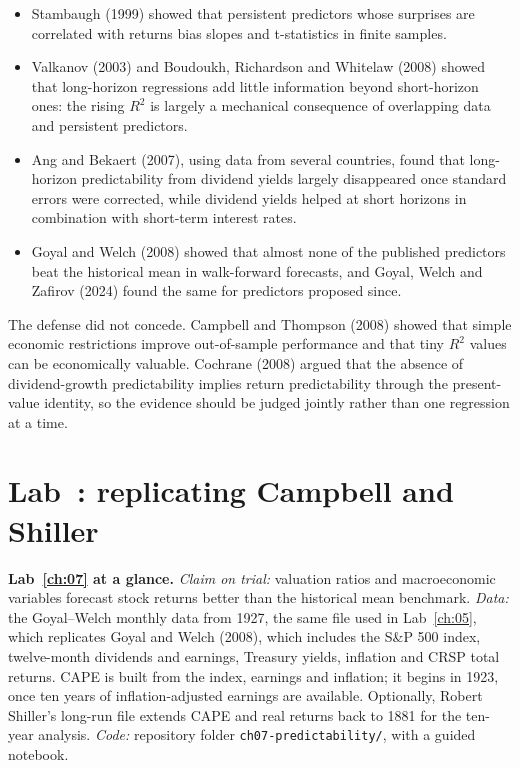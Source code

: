 \begin{itemize}
  \item Stambaugh (1999) showed that persistent predictors whose surprises are correlated with returns bias slopes and t-statistics in finite samples.
  \item Valkanov (2003) and Boudoukh, Richardson and Whitelaw (2008) showed that long-horizon regressions add little information beyond short-horizon ones: the rising $R^2$ is largely a mechanical consequence of overlapping data and persistent predictors.
  \item Ang and Bekaert (2007), using data from several countries, found that long-horizon predictability from dividend yields largely disappeared once standard errors were corrected, while dividend yields helped at short horizons in combination with short-term interest rates.
  \item Goyal and Welch (2008) showed that almost none of the published predictors beat the historical mean in walk-forward forecasts, and Goyal, Welch and Zafirov (2024) found the same for predictors proposed since.
\end{itemize}

The defense did not concede. Campbell and Thompson (2008) showed that simple economic restrictions improve out-of-sample performance and that tiny $R^2$ values can be economically valuable. Cochrane (2008) argued that the absence of dividend-growth predictability implies return predictability through the present-value identity, so the evidence should be judged jointly rather than one regression at a time.

\section{Lab~\thechapter: replicating Campbell and Shiller}
\label{sec:07-lab}

\begin{callout}
\textbf{Lab~\ref{ch:07} at a glance.} \emph{Claim on trial:} valuation ratios and macroeconomic variables forecast stock returns better than the historical mean benchmark. \emph{Data:} the Goyal--Welch monthly data from 1927, the same file used in Lab~\ref{ch:05}, which replicates Goyal and Welch (2008), which includes the S\&P 500 index, twelve-month dividends and earnings, Treasury yields, inflation and CRSP total returns. CAPE is built from the index, earnings and inflation; it begins in 1923, once ten years of inflation-adjusted earnings are available. Optionally, Robert Shiller's long-run file extends CAPE and real returns back to 1881 for the ten-year analysis. \emph{Code:} repository folder \texttt{ch07-predictability/}, with a guided notebook.
\end{callout}

